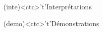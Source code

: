 \documentclass[../../main/main.tex]{subfiles}
\begin{document}
\begin{tcn}[%
		sidebyside, fontupper=\small, fontlower=\small
	]
	\begin{tcn}[nsp](inte)<ctc>'t'{Interprétations}
		\vspace{-25pt}
	\end{tcn}
	\begin{tcn}[nsp](demo)<ctc>'t'{Démonstrations}
		\vspace{-25pt}
	\end{tcn}

\end{tcn}
\end{document}
